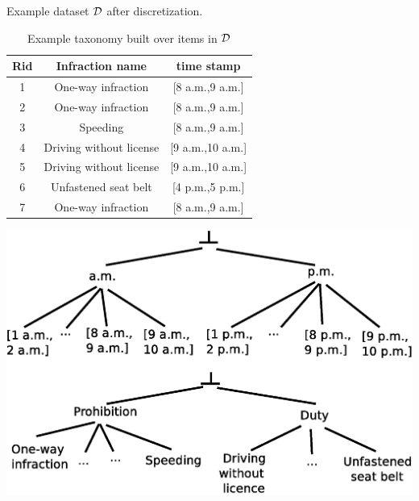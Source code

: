 \documentclass[10pt, conference, compsocconf]{IEEEtran}
\begin{document}
\begin{table}%
\parbox{0.42\textwidth}{
\caption{Example dataset $\cal{D}$ after discretization.}
\begin{scriptsize}
\begin{center}
\begin{tabular}{|c||c|c|}
\hline {\bf Rid} & {\bf Infraction name} & {\bf time stamp} \\
\hline
\hline 1 & One-way infraction & [8 a.m.,9 a.m.] \\
\hline 2 & One-way infraction & [8 a.m.,9 a.m.] \\
\hline 3 & Speeding & [8 a.m.,9 a.m.] \\
\hline 4 & Driving without license & [9 a.m.,10 a.m.] \\
\hline 5 & Driving without license & [9 a.m.,10 a.m.] \\
\hline 6 & Unfastened seat belt & [4 p.m.,5 p.m.] \\
\hline 7 & One-way infraction & [8 a.m.,9 a.m.] \\
\hline
\end{tabular}
\end{center}
\end{scriptsize}
\label{tab:example2}
\vspace{1cm}
}
\qquad
\begin{minipage}[c]{0.37\textwidth}%
\centering
\caption{Example taxonomy built over items in $\cal{D}$}
\includegraphics[width=\textwidth]{gerarchia/GerarchiaISPATre.eps}
\label{fig:tax}
\end{minipage}
\end{table}
\end{document}
